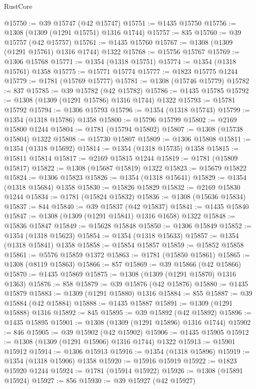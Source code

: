 \begin{lexlean}{RustCore}
\begin{coremodule}
@15750 := @39 @15747 (@42 @15747)
@15751 := @1435 @15750
@15756 := @1308 (@1309 (@1291 @15751) @1316 @1744)
@15757 := 835
@15760 := @39 @15757 (@42 @15757)
@15761 := @1435 @15760
@15767 := @1308 (@1309 (@1291 @15761) @1316 @1744) @1322
@15768 := @15756 @15767
@15769 := @1306 @15768
@15771 := @1354 (@1318 @15751)
@15774 := @1354 (@1318 @15761) @1358
@15775 := @15771 @15774
@15777 := @1823 @15775 @1244
@15779 := @1781 (@15769 @15777)
@15781 := @1308 (@15746 @15779)
@15782 := 837
@15785 := @39 @15782 (@42 @15782)
@15786 := @1435 @15785
@15792 := @1308 (@1309 (@1291 @15786) @1316 @1744) @1322
@15793 := @15781 @15792
@15794 := @1306 @15793
@15796 := @1354 (@1318 @15743)
@15799 := @1354 (@1318 @15786) @1358
@15800 := @15796 @15799
@15802 := @2169 @15800 @1244
@15804 := @1781 (@15794 @15802)
@15807 := @1308 (@15738 @15804) @1322
@15808 := @15730 @15807
@15809 := @1306 @15808
@15811 := @1354 (@1318 @15692)
@15814 := @1354 (@1318 @15735) @1358
@15815 := @15811 @15814
@15817 := @2169 @15815 @1244
@15819 := @1781 (@15809 @15817)
@15822 := @1308 (@15687 @15819) @1322
@15823 := @15679 @15822
@15824 := @1306 @15823
@15826 := @1354 (@1318 @15641)
@15829 := @1354 (@1318 @15684) @1358
@15830 := @15826 @15829
@15832 := @2169 @15830 @1244
@15834 := @1781 (@15824 @15832)
@15836 := @1308 (@15636 @15834)
@15837 := 844
@15840 := @39 @15837 (@42 @15837)
@15841 := @1435 @15840
@15847 := @1308 (@1309 (@1291 @15841) @1316 @1658) @1322
@15848 := @15836 @15847
@15849 := @15628 @15848
@15850 := @1306 @15849
@15852 := @1354 (@1318 @15623)
@15854 := @1354 (@1318 @15633)
@15857 := @1354 (@1318 @15841) @1358
@15858 := @15854 @15857
@15859 := @15852 @15858
@15861 := @5576 @15859 @1372
@15863 := @1781 (@15850 @15861)
@15865 := @1308 (@8119 @15863)
@15866 := 857
@15869 := @39 @15866 (@42 @15866)
@15870 := @1435 @15869
@15875 := @1308 (@1309 (@1291 @15870) @1316 @1363)
@15876 := 858
@15879 := @39 @15876 (@42 @15876)
@15880 := @1435 @15879
@15883 := @1309 (@1291 @15880) @1316
@15884 := 855
@15887 := @39 @15884 (@42 @15884)
@15888 := @1435 @15887
@15891 := @1309 (@1291 @15888) @1316
@15892 := 845
@15895 := @39 @15892 (@42 @15892)
@15896 := @1435 @15895
@15901 := @1308 (@1309 (@1291 @15896) @1316 @1744)
@15902 := 846
@15905 := @39 @15902 (@42 @15902)
@15906 := @1435 @15905
@15912 := @1308 (@1309 (@1291 @15906) @1316 @1744) @1322
@15913 := @15901 @15912
@15914 := @1306 @15913
@15916 := @1354 (@1318 @15896)
@15919 := @1354 (@1318 @15906) @1358
@15920 := @15916 @15919
@15922 := @1823 @15920 @1244
@15924 := @1781 (@15914 @15922)
@15926 := @1308 (@15891 @15924)
@15927 := 856
@15930 := @39 @15927 (@42 @15927)

\end{coremodule}
\end{lexlean}
